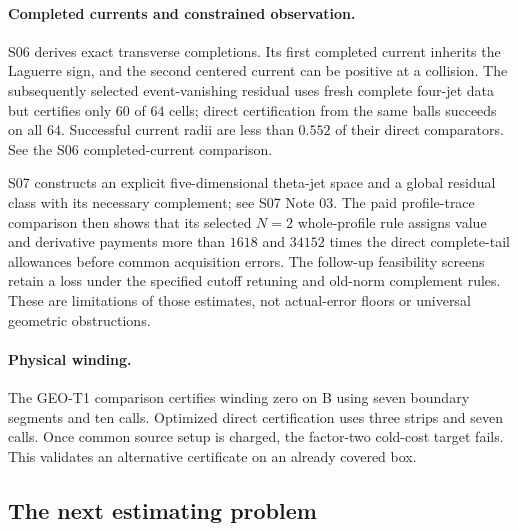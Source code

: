 \paragraph{Completed currents and constrained observation.}
S06 derives exact transverse completions. Its first completed current
inherits the Laguerre sign, and the second centered current can be
positive at a collision. The subsequently selected event-vanishing
residual uses fresh complete four-jet data but certifies only $60$ of
$64$ cells; direct certification from the same balls succeeds on all
$64$. Successful current radii are less than $0.552$ of their direct
comparators. See the
{S06 completed-current comparison}.

S07 constructs an explicit five-dimensional theta-jet space and a global
residual class with its necessary complement; see
{S07 Note 03}. The
{paid profile-trace comparison} then shows that its selected $N=2$
whole-profile rule assigns value and derivative payments more than
$1618$ and $34152$ times the direct complete-tail allowances before
common acquisition errors. The
{follow-up feasibility screens} retain a loss under the specified cutoff
retuning and old-norm complement rules. These are limitations of those
estimates, not actual-error floors or universal geometric obstructions.

\paragraph{Physical winding.}
The 
{GEO-T1 comparison} certifies winding zero on B using seven boundary
segments and ten calls. Optimized direct certification uses three strips
and seven calls. Once common source setup is charged, the factor-two
cold-cost target fails. This validates an alternative certificate on an
already covered box.

\subsection{The next estimating problem}

